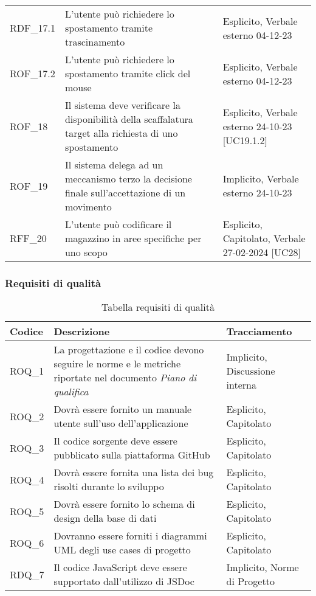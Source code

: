 \begin{xltabular}{\textwidth}{ p{0.1\textwidth} | X | p{0.3\textwidth} }
    RDF\_17.1 & L'utente può richiedere lo spostamento tramite trascinamento & Esplicito, Verbale esterno 04-12-23\\
    ROF\_17.2 & L'utente può richiedere lo spostamento tramite click del mouse & Esplicito, Verbale esterno 04-12-23\\
    ROF\_18 & Il sistema deve verificare la disponibilità della scaffalatura target alla richiesta di uno spostamento & Esplicito, Verbale esterno 24-10-23 [UC19.1.2]\\
    ROF\_19 & Il sistema delega ad un meccanismo terzo la decisione finale sull'accettazione di un movimento & Implicito, Verbale esterno 24-10-23\\
    RFF\_20 & L'utente può codificare il magazzino in aree specifiche per uno scopo & Esplicito, Capitolato, Verbale 27-02-2024 [UC28]\\
    \hline
\end{xltabular}


\subsubsection{Requisiti di qualità}\label{subsec:requisiti_qualita}
\begin{xltabular}{\textwidth}{ p{0.1\textwidth} | X | p{0.3\textwidth} }
    \textbf{\color{white} Codice} & \textbf{\color{white} Descrizione} & \textbf{\color{white} Tracciamento} \\ 
    \endhead

    \caption{Tabella requisiti di qualità}
    \endlastfoot

    ROQ\_1 & La progettazione e il codice devono seguire le norme e le metriche riportate nel documento \textit{Piano di qualifica} & Implicito, Discussione interna \\
    ROQ\_2 & Dovrà essere fornito un manuale utente sull'uso dell'applicazione & Esplicito, Capitolato \\
    ROQ\_3 & Il codice sorgente deve essere pubblicato sulla piattaforma GitHub & Esplicito, Capitolato \\
    ROQ\_4 & Dovrà essere fornita una lista dei bug risolti durante lo sviluppo & Esplicito, Capitolato \\ 
    ROQ\_5 & Dovrà essere fornito lo schema di design della base di dati & Esplicito, Capitolato \\ 
    ROQ\_6 & Dovranno essere forniti i diagrammi UML degli use cases di progetto & Esplicito, Capitolato \\ 
    RDQ\_7 & Il codice JavaScript deve essere supportato dall'utilizzo di JSDoc & Implicito, Norme di Progetto \\
    \hline
\end{xltabular}


